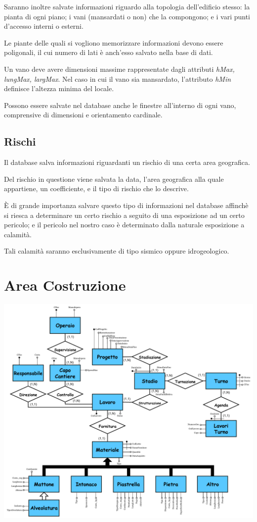 \documentclass[12pt,a4paper]{report}
\begin{document}
            Saranno inoltre salvate informazioni riguardo alla topologia dell'edificio stesso: la pianta
            di ogni piano; i vani (mansardati o non) che la compongono; e 
            i vari punti d'accesso interni o esterni.

            Le piante delle quali si vogliono memorizzare informazioni devono essere poligonali, il cui numero di lati è anch'esso 
            salvato nella base di dati.

            Un vano deve avere dimensioni massime rappresentate dagli attributi \emph{hMax, lungMax, largMax}. Nel caso in cui il vano sia mansardato, l'attributo \emph{hMin} definisce l'altezza minima del locale.

            Possono essere salvate nel database anche le finestre all'interno di ogni vano, comprensive di dimensioni e orientamento cardinale.

        \section{Rischi}
            Il database salva informazioni riguardanti un rischio di una certa area geografica. 
            
            Del rischio in questione viene salvata la data, l'area geografica alla quale appartiene, un coefficiente, e il tipo di rischio che lo descrive.

            È di grande importanza salvare questo tipo di informazioni nel database affinchè si riesca a determinare un certo rischio a seguito di una esposizione ad un certo pericolo; e il pericolo nel nostro caso è determinato dalla naturale esposizione a calamità.

            Tali calamità saranno esclusivamente di tipo sismico oppure idrogeologico.
    
\chapter{Area Costruzione}
        \begin{center}
            \includegraphics[scale=0.78]{ER_costruzione.pdf}
        \end{center}
        \newpage
\end{document}
